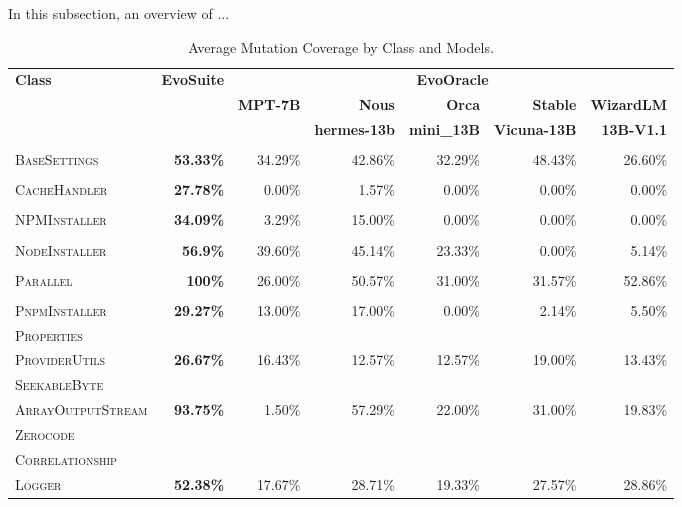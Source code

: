 In this subsection, an overview of ...

\begin{table}[H]
\centering

\begin{tabular}{| l | r | r | r | r | r | r |}
\hline
\multirow{2}{*}{\textbf{Class}} & \multirow{2}{*}{\textbf{EvoSuite}} & \multicolumn{5}{c|}{\textbf{EvoOracle}} \\ %
\cline{3-7} %
 &  & \textbf{MPT-7B} & \textbf{Nous} & \textbf{Orca} & \textbf{Stable} & \textbf{WizardLM} \\
 &  &  & \textbf{hermes-13b} & \textbf{mini\_13B} & \textbf{Vicuna-13B} & \textbf{13B-V1.1} \\
\hline
\scriptsize\textsc{} &  &  &  &  &  &  \\
\scriptsize\textsc{BaseSettings} & \textbf{53.33\%} & 34.29\% & 42.86\% & 32.29\% & 48.43\% & 26.60\% \\
\hline
\scriptsize\textsc{} &  &  &  &  &  &  \\
\scriptsize\textsc{CacheHandler} & \textbf{27.78\%} & 0.00\% & 1.57\% & 0.00\% & 0.00\% & 0.00\% \\
\hline
\scriptsize\textsc{} &  &  &  &  &  &  \\
\scriptsize\textsc{NPMInstaller} & \textbf{34.09\%} & 3.29\% & 15.00\% & 0.00\% & 0.00\% & 0.00\% \\
\hline
\scriptsize\textsc{} &  &  &  &  &  &  \\
\scriptsize\textsc{NodeInstaller} & \textbf{56.9\%} & 39.60\% & 45.14\% & 23.33\% & 0.00\% & 5.14\% \\
\hline
\scriptsize\textsc{} &  &  &  &  &  &  \\
\scriptsize\textsc{Parallel} & \textbf{100\%} & 26.00\% & 50.57\% & 31.00\% & 31.57\% & 52.86\% \\
\hline
\scriptsize\textsc{} &  &  &  &  &  &  \\
\scriptsize\textsc{PnpmInstaller} & \textbf{29.27\%} & 13.00\% & 17.00\% & 0.00\% & 2.14\% & 5.50\% \\
\hline
\scriptsize\textsc{Properties} &  &  &  &  &  &  \\
\scriptsize\textsc{ProviderUtils} & \textbf{26.67\%} & 16.43\% & 12.57\% & 12.57\% & 19.00\% & 13.43\% \\
\hline
\scriptsize\textsc{SeekableByte} &  &  &  &  &  &  \\
\scriptsize\textsc{ArrayOutputStream} & \textbf{93.75\%} & 1.50\% & 57.29\% & 22.00\% & 31.00\% & 19.83\% \\
\hline
\scriptsize\textsc{Zerocode} &  &  &  &  &  &  \\
\scriptsize\textsc{Correlationship} &  &  &  &  &  &  \\
\scriptsize\textsc{Logger} & \textbf{52.38\%} & 17.67\% & 28.71\% & 19.33\% & 27.57\% & 28.86\% \\
\hline

\end{tabular}
\caption{Average Mutation Coverage by Class and Models.\protect\footnotemark}
\label{tab:mutation_coverage}
\end{table}

